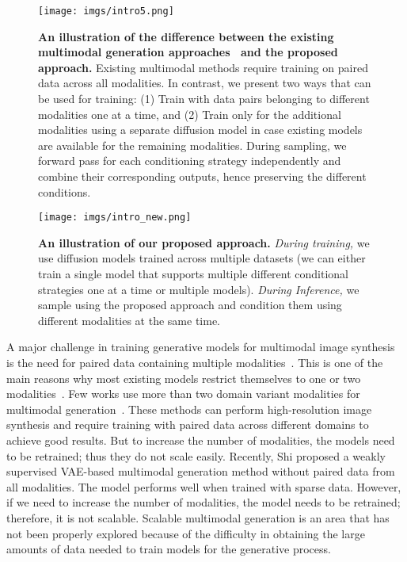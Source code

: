 \documentclass[10pt,twocolumn,letterpaper]{article}
\begin{document}
\begin{figure}[tb]
    \centering
    \texttt{[image: imgs/intro5.png]}
  \caption{\textbf{An illustration of the difference between the existing multimodal generation approaches~\cite{xia2021tedigan} and the proposed approach.} Existing multimodal methods require training on paired data across all modalities. In contrast, we present two ways that can be used for training: (1) Train with data pairs belonging to different modalities one at a time, and (2) Train only for the additional modalities using a separate diffusion model in case existing models are available for the remaining modalities. During sampling, we forward pass for each conditioning strategy independently and combine their corresponding outputs, hence preserving the different conditions.}
    \label{fig:intro2}
    \vspace{-5mm}
\end{figure}


\begin{figure*}[tbh!]
    \centering
    \texttt{[image: imgs/intro\_new.png]}
\vskip-12pt
    \caption{\textbf{An illustration of our proposed approach.} \textit{During training,} we use diffusion models trained across multiple datasets (we can either train a single model that supports multiple different conditional strategies one at a time or multiple models). \textit{During Inference,} we sample using the proposed approach and condition them using different modalities at the same time.}
    \label{fig:main_fig}
    \label{fig:main}
    \vspace{0mm}
\end{figure*}
  


 
 




A major challenge in training generative models for multimodal image synthesis is the need for paired data containing multiple modalities~\cite{wu2018multimodal,shi2019variational,huang2022multimodal}. This is one of the main reasons why most existing models restrict themselves to one or two modalities~\cite{wu2018multimodal,shi2019variational}. Few works use more than two domain variant modalities for multimodal generation~\cite{huang2021multimodal,xia2021tedigan}. These methods can perform high-resolution image synthesis and require training with paired data across different domains to achieve good results. But to increase the number of modalities, the models need to be retrained; thus they do not scale easily.  Recently, Shi \etal \cite{shi2019variational} proposed a weakly supervised VAE-based multimodal generation method without paired data from all modalities. The model performs well when trained with sparse data. However, if we need to increase the number of modalities, the model needs to be retrained; therefore, it is not scalable. Scalable multimodal generation is an area that has not been properly explored because of the difficulty in obtaining the large amounts of data needed to train models for the generative process.
\end{document}
